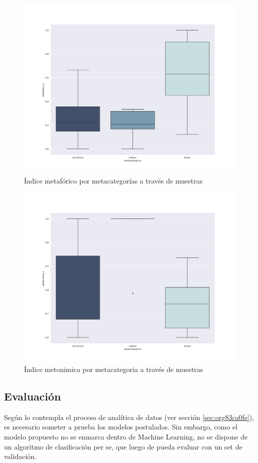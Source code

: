 \documentclass[12pt,letterpaper,twoside]{article}
\begin{document}
\begin{figure}[H]
\centering
\includegraphics[width=0.9\linewidth]{./resultados/graphs/total/metafora_total.png}
\caption{\label{fig:metafora_total} Índice metafórico por metacategorías a través de muestras }
\end{figure}

\begin{figure}[H]
\centering
\includegraphics[width=0.9\linewidth]{./resultados/graphs/total/metonimia_total.png}
\caption{\label{fig:metonimia_total} Índice metonimica por metacategoria a través de muestras }
\end{figure}

\subsection{Evaluación}
\label{sec:org3232855}
Según lo contempla el proceso de analítica de datos (ver sección \ref{sec:org83ca0fe}),
es necesario someter a prueba los modelos postulados. Sin embargo, como el modelo propuesto
no se enmarca dentro de Machine Learning, no se dispone de un algoritmo de clasificación
per se, que luego de pueda evaluar con un set de validación.
\end{document}
